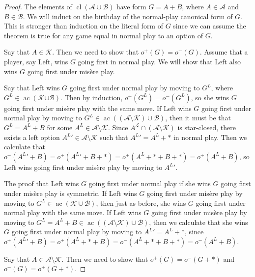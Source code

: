 \documentclass[10pt,a4paper]{amsart}
\DeclareMathOperator{\ac}{ac}
\DeclareMathOperator{\cl}{cl}
\begin{document}
\begin{proof}
    The elements of $\cl(\mathscr{A} \cup \mathscr{B})$ have form $G= A+B$, where $A \in \mathscr{A}$ and $B \in \mathscr{B}$. We will induct on the birthday of the normal-play canonical form of $G$. This is stronger than induction on the literal form of $G$ since we can assume the theorem is true for any game equal in normal play to an option of $G$.

    Say that $A \in \mathscr{K}$. Then we need to show that $o^+(G) = o^-(G)$. Assume that a player, say Left, wins $G$ going first in normal play. We will show that Left also wins $G$ going first under mis\`ere play.

Say that Left wins $G$ going first under normal play by moving to $G^L$, where $G^L \in \ac(\mathscr{K{ \cup \mathscr{B}}})$. Then by induction, $o^+(G^L) = o^-(G^L)$, so she wins $G$ going first under mis\`ere play with the same move. If Left wins $G$ going first under normal play by moving to $G^L \in \ac( (\mathscr{A}\setminus \mathscr{K} )\cup \mathscr{B})$, then it must be that $G^L = A^L+B$ for some $A^L \in \mathscr{A}\setminus \mathscr{K} $. Since $A^{\mathcal{L}} \cap (\mathscr{A} \setminus \mathscr{K})$ is star-closed, there exists a left option ${A^L}' \in \mathscr{A}\setminus\mathscr{K} $ such that ${A^L}' = A^L+*$ in normal play. Then we calculate that $o^-({A^L}' +B) = o^+({A^L}' + B + *) =o^+(A^L+*+B+*) = o^+(A^L+B)$, so Left wins going first under mis\`ere play by moving to ${A^L}'$.

The proof that Left wins $G$ going first under normal play if she wins $G$ going first under mis\`ere play is symmetric. If Left wins $G$ going first under mis\`ere play by moving to $G^L \in\ac(  \mathscr{K} \cup \mathscr{B})$, then just as before,  she wins $G$ going first under normal play with the same move. If Left wins $G$ going first under mis\`ere play by moving to $G^L  = A^L + B \in \ac( (\mathscr{A}\setminus \mathscr{K} )\cup \mathscr{B})$, then we calculate that she wins $G$ going first under normal play by moving to ${A^L}' = A^L +*$, since $o^+({A^L}' +B) = o^+(A^L+*+B) = o^-(A^L+*+B+*) = o^-(A^L+B)$. 

    Say that $A \in \mathscr{A} \setminus \mathscr{K}$. Then we need to show that $o^+(G) = o^-(G+*)$ and $o^-(G) = o^+(G+*)$. 


\end{proof}
\end{document}
